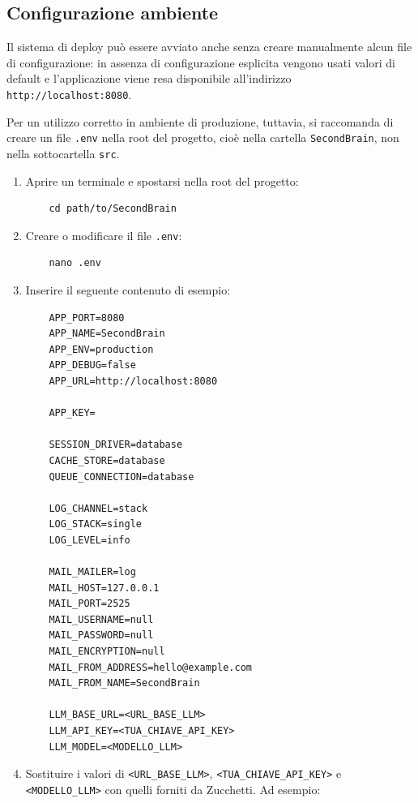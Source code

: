 \documentclass[a4paper,10pt]{article}
\begin{document}
\subsection{Configurazione ambiente}
Il sistema di deploy può essere avviato anche senza creare manualmente alcun file di configurazione: in assenza di configurazione esplicita vengono usati valori di default e l'applicazione viene resa disponibile all'indirizzo \texttt{http://localhost:8080}.

Per un utilizzo corretto in ambiente di produzione, tuttavia, si raccomanda di creare un file \texttt{.env} nella root del progetto, cioè nella cartella \texttt{SecondBrain}, non nella sottocartella \texttt{src}.

\begin{enumerate}
  \item Aprire un terminale e spostarsi nella root del progetto:

  \begin{lstlisting}
    cd path/to/SecondBrain
  \end{lstlisting}

  \item Creare o modificare il file \texttt{.env}:

  \begin{lstlisting}
    nano .env
  \end{lstlisting}

  \item Inserire il seguente contenuto di esempio:

  \begin{lstlisting}
    APP_PORT=8080
    APP_NAME=SecondBrain
    APP_ENV=production
    APP_DEBUG=false
    APP_URL=http://localhost:8080

    APP_KEY=

    SESSION_DRIVER=database
    CACHE_STORE=database
    QUEUE_CONNECTION=database

    LOG_CHANNEL=stack
    LOG_STACK=single
    LOG_LEVEL=info

    MAIL_MAILER=log
    MAIL_HOST=127.0.0.1
    MAIL_PORT=2525
    MAIL_USERNAME=null
    MAIL_PASSWORD=null
    MAIL_ENCRYPTION=null
    MAIL_FROM_ADDRESS=hello@example.com
    MAIL_FROM_NAME=SecondBrain

    LLM_BASE_URL=<URL_BASE_LLM>
    LLM_API_KEY=<TUA_CHIAVE_API_KEY>
    LLM_MODEL=<MODELLO_LLM>
  \end{lstlisting}

  \item Sostituire i valori di \verb|<URL_BASE_LLM>|, \verb|<TUA_CHIAVE_API_KEY>| e \verb|<MODELLO_LLM>| con quelli forniti da Zucchetti. Ad esempio:


\end{enumerate}
\end{document}
